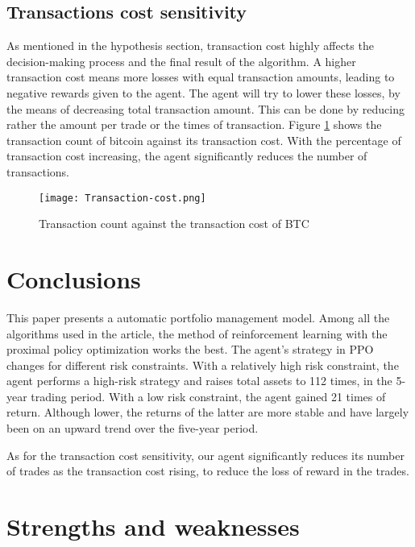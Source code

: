 \documentclass{mcmthesis}
\begin{document}
\subsection{Transactions cost sensitivity}

As mentioned in the hypothesis section, transaction cost highly affects the decision-making process and the final result of the algorithm.
A higher transaction cost means more losses with equal transaction amounts,
leading to negative rewards given to the agent.
The agent will try to lower these losses, by the means of decreasing total transaction amount.
This can be done by reducing rather the amount per trade or the times of transaction.
Figure \ref{Transaction-cost} shows the transaction count of bitcoin against its transaction cost.
With the percentage of transaction cost increasing, the agent significantly reduces the number of transactions.

\begin{figure}[h]
  \small
  \centering
  \texttt{[image: Transaction-cost.png]}
  \caption{Transaction count against the transaction cost of BTC}
  \label{Transaction-cost}
\end{figure}

\section{Conclusions}

This paper presents a automatic portfolio management model.
Among all the algorithms used in the article, the method of reinforcement learning with the proximal policy optimization works the best.
The agent's strategy in PPO changes for different risk constraints.
With a relatively high risk constraint, the agent performs a high-risk strategy and raises total assets to 112 times, in the 5-year trading period.
With a low risk constraint, the agent gained 21 times of return. Although lower, the returns of the latter are more stable and have largely been on an upward trend over the five-year period.

As for the transaction cost sensitivity, our agent significantly reduces its number of trades as the transaction cost rising, to reduce the loss of reward in the trades.

\section{Strengths and weaknesses}
\end{document}
